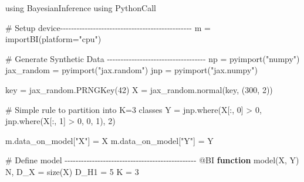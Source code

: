 \documentclass[
  letterpaper,
  DIV=11,
  numbers=noendperiod]{scrartcl}
\newenvironment{Shaded}{\begin{snugshade}}{\end{snugshade}}
\newcommand{\BuiltInTok}[1]{\textcolor[rgb]{0.00,0.23,0.31}{#1}}
\newcommand{\CommentTok}[1]{\textcolor[rgb]{0.37,0.37,0.37}{#1}}
\newcommand{\FloatTok}[1]{\textcolor[rgb]{0.68,0.00,0.00}{#1}}
\newcommand{\FunctionTok}[1]{\textcolor[rgb]{0.28,0.35,0.67}{#1}}
\newcommand{\ImportTok}[1]{\textcolor[rgb]{0.00,0.46,0.62}{#1}}
\newcommand{\KeywordTok}[1]{\textcolor[rgb]{0.00,0.23,0.31}{\textbf{#1}}}
\newcommand{\NormalTok}[1]{\textcolor[rgb]{0.00,0.23,0.31}{#1}}
\newcommand{\OperatorTok}[1]{\textcolor[rgb]{0.37,0.37,0.37}{#1}}
\newcommand{\PreprocessorTok}[1]{\textcolor[rgb]{0.68,0.00,0.00}{#1}}
\newcommand{\StringTok}[1]{\textcolor[rgb]{0.13,0.47,0.30}{#1}}
\begin{document}
\begin{Shaded}
\begin{Highlighting}[]
\ImportTok{using} \BuiltInTok{BayesianInference}
\ImportTok{using} \BuiltInTok{PythonCall}

\CommentTok{\# Setup device{-}{-}{-}{-}{-}{-}{-}{-}{-}{-}{-}{-}{-}{-}{-}{-}{-}{-}{-}{-}{-}{-}{-}{-}{-}{-}{-}{-}{-}{-}{-}{-}{-}{-}{-}{-}{-}{-}{-}{-}{-}{-}{-}{-}{-}{-}{-}{-}}
\NormalTok{m }\OperatorTok{=} \FunctionTok{importBI}\NormalTok{(platform}\OperatorTok{=}\StringTok{"cpu"}\NormalTok{)}

\CommentTok{\# Generate Synthetic Data {-}{-}{-}{-}{-}{-}{-}{-}{-}{-}{-}{-}{-}{-}{-}{-}{-}{-}{-}{-}{-}{-}{-}{-}{-}{-}{-}{-}{-}{-}{-}{-}{-}{-}{-}{-}}
\NormalTok{np }\OperatorTok{=} \FunctionTok{pyimport}\NormalTok{(}\StringTok{"numpy"}\NormalTok{)}
\NormalTok{jax\_random }\OperatorTok{=} \FunctionTok{pyimport}\NormalTok{(}\StringTok{"jax.random"}\NormalTok{)}
\NormalTok{jnp }\OperatorTok{=} \FunctionTok{pyimport}\NormalTok{(}\StringTok{"jax.numpy"}\NormalTok{)}

\NormalTok{key }\OperatorTok{=}\NormalTok{ jax\_random.}\FunctionTok{PRNGKey}\NormalTok{(}\FloatTok{42}\NormalTok{)}
\NormalTok{X }\OperatorTok{=}\NormalTok{ jax\_random.}\FunctionTok{normal}\NormalTok{(key, (}\FloatTok{300}\NormalTok{, }\FloatTok{2}\NormalTok{))}

\CommentTok{\# Simple rule to partition into K=3 classes}
\NormalTok{Y }\OperatorTok{=}\NormalTok{ jnp.}\FunctionTok{where}\NormalTok{(X[}\OperatorTok{:}\NormalTok{, }\FloatTok{0}\NormalTok{] }\OperatorTok{\textgreater{}} \FloatTok{0}\NormalTok{, jnp.}\FunctionTok{where}\NormalTok{(X[}\OperatorTok{:}\NormalTok{, }\FloatTok{1}\NormalTok{] }\OperatorTok{\textgreater{}} \FloatTok{0}\NormalTok{, }\FloatTok{0}\NormalTok{, }\FloatTok{1}\NormalTok{), }\FloatTok{2}\NormalTok{)}

\NormalTok{m.data\_on\_model[}\StringTok{"X"}\NormalTok{] }\OperatorTok{=}\NormalTok{ X}
\NormalTok{m.data\_on\_model[}\StringTok{"Y"}\NormalTok{] }\OperatorTok{=}\NormalTok{ Y}

\CommentTok{\# Define model {-}{-}{-}{-}{-}{-}{-}{-}{-}{-}{-}{-}{-}{-}{-}{-}{-}{-}{-}{-}{-}{-}{-}{-}{-}{-}{-}{-}{-}{-}{-}{-}{-}{-}{-}{-}{-}{-}{-}{-}{-}{-}{-}{-}{-}{-}{-}{-}}
\PreprocessorTok{@BI} \KeywordTok{function} \FunctionTok{model}\NormalTok{(X, Y)}
\NormalTok{    N, D\_X }\OperatorTok{=} \FunctionTok{size}\NormalTok{(X)}
\NormalTok{    D\_H1 }\OperatorTok{=} \FloatTok{5}
\NormalTok{    K }\OperatorTok{=} \FloatTok{3}
    

\end{Highlighting}
\end{Shaded}
\end{document}
